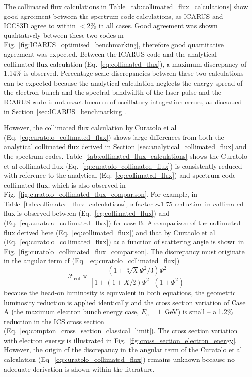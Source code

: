 \documentclass[../main.tex]{subfiles}
\begin{document}
The collimated flux calculations in Table~\ref{tab:collimated_flux_calculations} show good agreement between the spectrum code calculations, as \textsc{ICARUS} and \textsc{ICCS3D} agree to within $< 2\%$ in all cases. Good agreement was shown qualitatively between these two codes in Fig.~\ref{fig:ICARUS_optimised_benchmarking}, therefore good quantitative agreement was expected. Between the \textsc{ICARUS} code and the analytical collimated flux calculation (Eq.~\ref{eq:collimated_flux}), a maximum discrepancy of 1.14\% is observed. Percentage scale discrepancies between these two calculations can be expected because the analytical calculation neglects the energy spread of the electron bunch and the spectral bandwidth of the laser pulse and the \textsc{ICARUS} code is not exact because of oscillatory integration errors, as discussed in Section~\ref{sec:ICARUS_benchmarking}. 

However, the collimated flux calculation by Curatolo et al \cite{curatolo2017analytical} (Eq.~\ref{eq:curatolo_collimated_flux}) shows large differences from both the analytical collimated flux derived in Section~\ref{sec:analytical_collimated_flux} and the spectrum codes. Table~\ref{tab:collimated_flux_calculations} shows the Curatolo et al collimated flux (Eq.~\ref{eq:curatolo_collimated_flux}) is consistently reduced with reference to the analytical (Eq.~\ref{eq:collimated_flux}) and spectrum code collimated flux, which is also observed in Fig.~\ref{fig:curatolo_collimated_flux_comparison}. For example, in Table~\ref{tab:collimated_flux_calculations}, a factor $\sim 1.75$ reduction in collimated flux is observed between (Eq.~\ref{eq:collimated_flux}) and (Eq.~\ref{eq:curatolo_collimated_flux}) for case B. A comparison of the collimated  flux derived here (Eq.~\ref{eq:collimated_flux}) and that by Curatolo et al \cite{curatolo2017analytical} (Eq.~\ref{eq:curatolo_collimated_flux}) as a function of scattering angle is shown in Fig.~\ref{fig:curatolo_collimated_flux_comparison}. The discrepancy must originate in the angular term of (Eq.~\ref{eq:curatolo_collimated_flux})
\begin{equation*}
\mathcal{F}_{\mathrm{col}}\propto\frac{\left(1+\sqrt[3]{X}\Psi^{2}/3\right)\Psi^{2}}{\left[1+\left(1+X/2\right)\Psi^{2}\right]\left(1+\Psi^{2}\right)}    
\end{equation*}
because the head-on luminosity is equivalent in both equations, the geometric luminosity reduction is applied identically and the cross section variation of Case A (the maximum electron bunch energy case, $E_{e}=1$~\si{\giga\electronvolt}) is small -- a 1.2\% reduction in the ICS cross section (Eq.~\ref{eq:compton_cross_section_classical_limit}). The cross section variation with electron energy is illustrated in Fig.~\ref{fig:cross_section_electron_energy}. However, the origin of the discrepancy in the angular term of the Curatolo et al \cite{curatolo2017analytical} calculation (Eq.~\ref{eq:curatolo_collimated_flux}) remains unknown because no adequate derivation is shown within the literature.   
\end{document}
